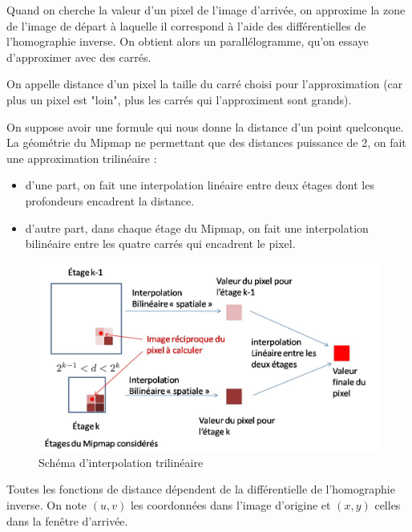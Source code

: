 Quand on cherche la valeur d'un pixel de l'image d'arrivée, on approxime la zone de l'image de départ à laquelle il correspond à l'aide des différentielles de l'homographie inverse. On obtient alors un parallélogramme, qu'on essaye d'approximer avec des carrés.


On appelle distance d'un pixel la taille du carré choisi pour l'approximation (car plus un pixel est "loin", plus les carrés qui l'approximent sont grands). 

On suppose avoir une formule qui nous donne la distance d'un point quelconque. La géométrie du Mipmap ne permettant que des distances puissance de 2, on fait une approximation trilinéaire : 

\begin{itemize}
  \item d'une part, on fait une interpolation linéaire entre deux étages dont les profondeurs encadrent la distance.
  \item d'autre part, dans chaque étage du Mipmap, on fait une interpolation bilinéaire entre les quatre carrés qui encadrent le pixel.
\end{itemize}

\begin{figure}[h!]
\centering
\caption{Schéma d'interpolation trilinéaire}
\includegraphics[scale=0.5]{intertrilineaire.jpg}
\end{figure}


Toutes les fonctions de distance dépendent de la différentielle de l'homographie inverse.
On note $(u,v)$ les coordonnées dans l'image d'origine et $(x,y)$ celles dans la fenêtre d'arrivée.

